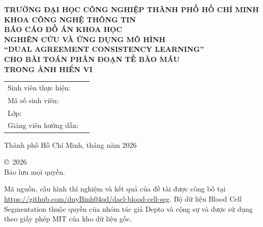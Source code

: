 \documentclass[12pt,a4paper,oneside]{report}
\begin{document}
\begin{titlepage}
  \centering
  {\normalsize \textbf{TRƯỜNG ĐẠI HỌC CÔNG NGHIỆP THÀNH PHỐ HỒ CHÍ MINH}}\\[4pt]
  {\normalsize \textbf{KHOA CÔNG NGHỆ THÔNG TIN}}\\[2.5cm]

  {\Large \textbf{BÁO CÁO ĐỒ ÁN KHOA HỌC}}\\[1.5cm]

  {\Large \textbf{NGHIÊN CỨU VÀ ỨNG DỤNG MÔ HÌNH\\[6pt]
  {\large ``DUAL AGREEMENT CONSISTENCY LEARNING''}\\[6pt]
  CHO BÀI TOÁN PHÂN ĐOẠN TẾ BÀO MÁU\\[6pt]
  TRONG ẢNH HIỂN VI}}\\[3cm]

  \begin{tabular}{ll}
    Sinh viên thực hiện: & \underline{\hspace{6cm}} \\[4pt]
    Mã số sinh viên:     & \underline{\hspace{6cm}} \\[4pt]
    Lớp:                 & \underline{\hspace{6cm}} \\[4pt]
    Giảng viên hướng dẫn:& \underline{\hspace{6cm}} \\
  \end{tabular}

  \vfill
  {\large Thành phố Hồ Chí Minh, tháng \underline{\hspace{1cm}} năm 2026}
\end{titlepage}


\thispagestyle{empty}
\vspace*{\fill}
\begin{center}
  \copyright\ 2026 \underline{\hspace{6cm}}\\[4pt]
  Bảo lưu mọi quyền.
\end{center}
\noindent Mã nguồn, cấu hình thí nghiệm và kết quả của đề tài được công bố tại\\
\url{https://github.com/duyBinh04qd/dacl-blood-cell-seg}.
Bộ dữ liệu Blood Cell Segmentation thuộc quyền của nhóm tác giả Depto và cộng sự và được sử dụng theo giấy phép MIT của kho dữ liệu gốc.
\vspace*{\fill}
\clearpage
\end{document}
